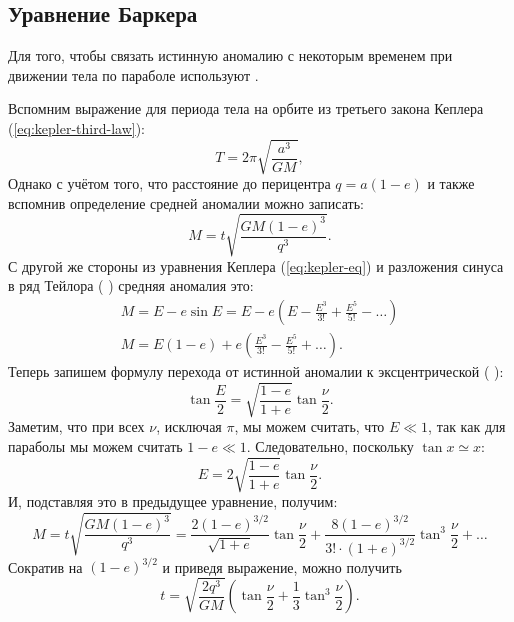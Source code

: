 \subsection{Уравнение Баркера}
Для того, чтобы связать истинную аномалию с некоторым временем при движении тела по параболе используют .

Вспомним выражение для периода тела на орбите из третьего закона Кеплера (\ref{eq:kepler-third-law}):
\begin{equation*}
	T = 2\pi \sqrt{\frac{a^3}{GM}},
\end{equation*}
Однако с учётом того, что расстояние до перицентра  $q = a(1-e)$ и также вспомнив определение средней аномалии можно записать:
\begin{equation*}
	M=t \sqrt{\frac{GM(1-e)^3}{q^3}}.
\end{equation*}
С другой же стороны из уравнения Кеплера (\ref{eq:kepler-eq}) и разложения синуса в ряд Тейлора (%
) средняя аномалия это:
\begin{gather*}
	M=E - e \sin E = E - e \left(E - \frac{E^3}{3!} + \frac{E^5}{5!} - \dots\right) \\
	M = E(1-e) + e\left(\frac{E^3}{3!} - \frac{E^5}{5!} + \dots \right).
\end{gather*}
Теперь запишем формулу перехода от истинной аномалии к эксцентрической (%
):
\begin{equation*}
	\tan \frac{E}{2} = \sqrt{\frac{1-e}{1+e}} \tan \frac{\nu}{2}.
\end{equation*}
Заметим, что при всех $\nu$, исключая $\pi$, мы можем считать, что $E \ll 1$, так как для параболы мы можем считать $1-e \ll 1$. Следовательно, поскольку $\tan x \simeq x$:
\begin{equation*}
	E = 2 \sqrt{\frac{1-e}{1+e}} \tan \frac{\nu}{2}.
\end{equation*}
И, подставляя это в предыдущее уравнение, получим:
\begin{equation*}
	M = t \sqrt{\frac{GM(1-e)^3}{q^3}} = \frac{2(1-e)^{3/2}}{\sqrt{1+e}}\tan\frac{\nu}{2} + \frac{8(1-e)^{3/2}}{3! \cdot (1+e)^{3/2}}\tan^3 \frac{\nu}{2} + \dots
\end{equation*}
Сократив на $(1-e)^{3/2}$ и приведя выражение, можно получить 
\begin{equation}
	t = \sqrt{\frac{2q^3}{GM}}\left(\tan \frac{\nu}{2 } + \frac{1}{3}\tan^3 \frac{\nu}{2}\right).
\end{equation}